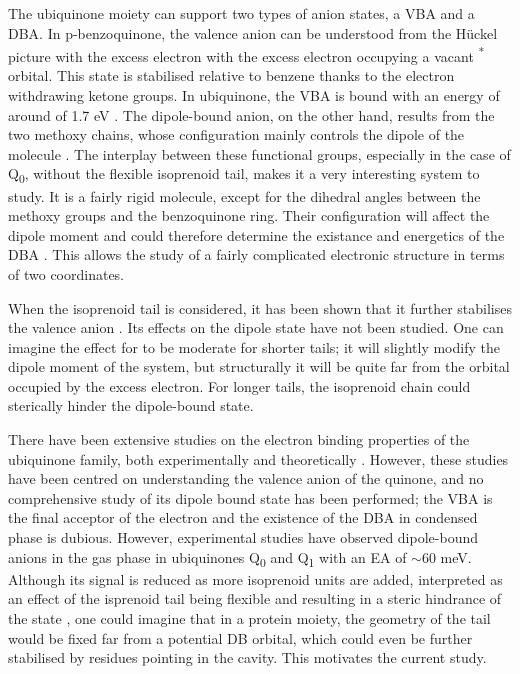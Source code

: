 The ubiquinone moiety can support two types of anion states, a VBA and a DBA. In p-benzoquinone, the valence anion can be understood from the H{\"u}ckel picture with the excess electron with the excess electron occupying a vacant \textpi \textsuperscript{*} orbital. This state is stabilised relative to benzene thanks to the electron withdrawing ketone groups. In ubiquinone, the VBA is bound with an energy of around of 1.7 eV \cite{chen2024low}. The dipole-bound anion, on the other hand, results from the two methoxy chains, whose configuration mainly controls the dipole of the molecule \cite{ameixa2023parent}. The interplay between these functional groups, especially in the case of Q\textsubscript{0}, without the flexible isoprenoid tail, makes it a very interesting system to study. It is a fairly rigid molecule, except for the dihedral angles between the methoxy groups and the benzoquinone ring. Their configuration will affect the dipole moment and could therefore determine the existance and energetics of the DBA \cite{ameixa2023parent,bull2015anion}. This allows the study of a fairly complicated electronic structure in terms of two coordinates.

When the isoprenoid tail is considered, it has been shown that it further stabilises the valence anion \cite{pshenichnyuk2020ionizing}. Its effects on the dipole state have not been studied. One can imagine the effect for to be moderate for shorter tails; it will slightly modify the dipole moment of the system, but structurally it will be quite far from the orbital occupied by the excess electron. For longer tails, the isoprenoid chain could sterically hinder the dipole-bound state.

There have been extensive studies on the electron binding properties of the ubiquinone family, both experimentally \cite{ameixa2023parent,west2014anion,pshenichnyuk2020ionizing,bull2015anion} and theoretically \cite{ameixa2023parent,pshenichnyuk2020ionizing,haldar2020multilayer, nonella1998quantum, gamiz2017terminal}. However, these studies have been centred on understanding the valence anion of the quinone, and no comprehensive study of its dipole bound state has been performed; the VBA is the final acceptor of the electron and the existence of the DBA in condensed phase is dubious.
However, experimental studies have observed dipole-bound anions in the gas phase in ubiquinones Q\textsubscript{0} and Q\textsubscript{1} \cite{ameixa2023parent} with an EA of $\mathrm{\sim}$60 meV. Although its signal is reduced as more isoprenoid units are added, interpreted as an effect of the isprenoid tail being flexible and resulting in a steric hindrance of the state \cite{ameixa2023parent,pshenichnyuk2020ionizing}, one could imagine that in a protein moiety, the geometry of the tail would be fixed far from a potential DB orbital, which could even be further stabilised by residues pointing in the cavity. This motivates the current study.

